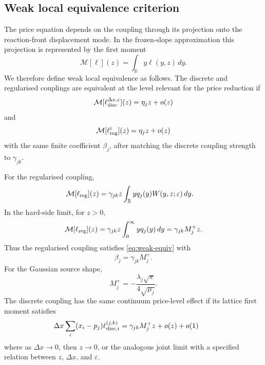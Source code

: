 \documentclass[5p,final]{elsarticle}
\begin{document}
\subsection{Weak local equivalence criterion}

The price equation depends on the coupling through its projection onto the reaction-front displacement mode.  In the frozen-slope approximation this projection is represented by the first moment
\begin{equation}
\mathcal M[\ell](z)=\int_{\mathbb R}y\ell(y,z)\,dy.
\end{equation}
We therefore define weak local equivalence as follows.  The discrete and regularised couplings are equivalent at the level relevant for the price reduction if
\begin{equation}
\mathcal M[\ell_{\rm disc}^{\Delta x,\varepsilon}](z)
=\eta_j z+o(z)
\end{equation}
and
\begin{equation}
\mathcal M[\ell_{\rm reg}^{\varepsilon}](z)
=\eta_j z+o(z)
\label{eq:weak-equiv}
\end{equation}
with the same finite coefficient $\beta_j$, after matching the discrete coupling strength to $\gamma_{jk}$.

For the regularised coupling,
\begin{align}
\mathcal M[\ell_{\rm reg}](z)
&=\gamma_{jk}z\int_{\mathbb R}yq_j(y)W(y,z;\varepsilon)\,dy.
\end{align}
In the hard-side limit, for $z>0$,
\begin{equation}
\mathcal M[\ell_{\rm reg}](z)
=\gamma_{jk}z\int_0^\infty yq_j(y)\,dy
=\gamma_{jk}M_j^+z.
\end{equation}
Thus the regularised coupling satisfies \eqref{eq:weak-equiv} with
\begin{equation}
\beta_j=\gamma_{jk}M_j^+.
\end{equation}
For the Gaussian source shape,
\begin{equation}
M_j^+=-\frac{\lambda_j\sqrt\pi}{4\sqrt{\mu_j}}.
\end{equation}
The discrete coupling has the same continuum price-level effect if its lattice first moment satisfies
\begin{equation}
\Delta x\sum_i (x_i-p_j)\ell_{{\rm disc},i}^{(j,k)}
=\gamma_{jk}M_j^+z+o(z)+o(1)
\qquad
\label{eq:lattice-moment-match}
\end{equation}
where as $\Delta x\to0$, then $z\to0$, or the analogous joint limit with a specified relation between $z$, $\Delta x$, and $\varepsilon$.
\end{document}

